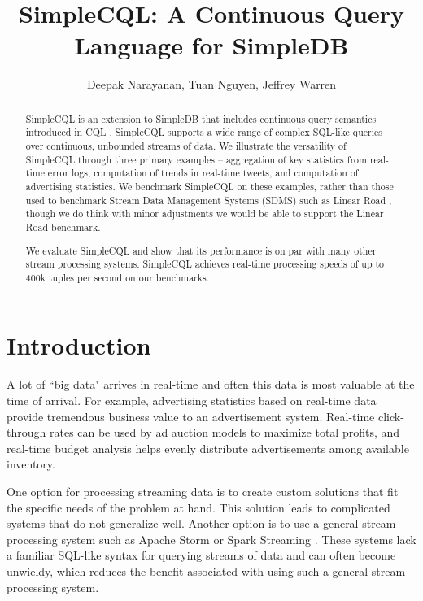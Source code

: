 \documentclass[a4paper, 10pt, conference]{IEEEconf}
\title{\LARGE \bf
SimpleCQL: A Continuous Query Language for SimpleDB
}
\author{Deepak Narayanan, Tuan Nguyen, Jeffrey Warren}
\begin{document}
\maketitle
\thispagestyle{empty}
\pagestyle{empty}


\begin{abstract}

SimpleCQL is an extension to SimpleDB \cite{simpledb} that includes continuous query semantics introduced in CQL \cite{cql}. SimpleCQL supports a wide range of complex SQL-like queries over continuous, unbounded streams of data.  We illustrate the versatility of SimpleCQL through three primary examples -- aggregation of key statistics from real-time error logs, computation of trends in real-time tweets, and computation of advertising statistics.  We benchmark SimpleCQL on these examples, rather than those used to benchmark Stream Data Management Systems (SDMS) such as Linear Road \cite{linear}, though we do think with minor adjustments we would be able to support the Linear Road benchmark.

We evaluate SimpleCQL and show that its performance is on par with many other stream processing systems.  SimpleCQL achieves real-time processing speeds of up to 400k tuples per second on our benchmarks.

\end{abstract}


\section{Introduction}

A lot of ``big data" arrives in real-time and often this data is most valuable at the time of arrival. For example, advertising statistics based on real-time data provide tremendous business value to an advertisement system.  Real-time click-through rates can be used by ad auction models to maximize total profits, and real-time budget analysis helps evenly distribute advertisements among available inventory.

One option for processing streaming data is to create custom solutions that fit the specific needs of the problem at hand.  This solution leads to complicated systems that do not generalize well.  Another option is to use a general stream-processing system such as Apache Storm \cite{storm} or Spark Streaming \cite{spark_streaming}.  These systems lack a familiar SQL-like syntax for querying streams of data and can often become unwieldy, which reduces the benefit associated with using such a general stream-processing system.
\end{document}
